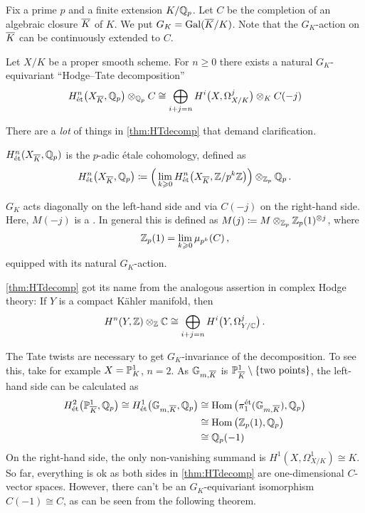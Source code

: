 \documentclass[a4paper, 10pt, oneside, DIV=9, chapterprefix=true, numbers=enddot]{scrbook}
\begin{document}
Fix a prime $p$ and a finite extension $K/\mathbb{Q}_p$. Let $C$ be the completion of an algebraic closure $\ov{K}$ of $K$. We put $G_K=\Gal(\ov{K}/K)$. Note that the $G_K$-action on $\ov{K}$ can be continuously extended to $C$.
\begin{thm}\label{thm:HTdecomp}
	Let $X/K$ be a proper smooth scheme. For $n\geq 0$ there exists a natural $G_K$-equivariant \enquote{Hodge--Tate decomposition}
	\begin{equation*}
		H_\et^n\big(X_{\ov{K}},\IQ_p\big)\otimes_{\IQ_p}C\cong \bigoplus_{i+j=n}H^i\big(X,\Omega_{X/K}^j\big)\otimes_KC(-j)
	\end{equation*}
\end{thm}
\begin{rem}\label{rem:HTdecomp}
	There are a \emph{lot} of things in \cref{thm:HTdecomp} that demand clarification.
	\begin{numerate}
		\item $H_\et^n(X_{\ov{K}},\IQ_p)$ is the $p$-adic étale cohomology, defined as
		\begin{equation*}
			H_\et^n\big(X_{\ov{K}},\IQ_p\big)\coloneqq \Big(\lim_{k\geq 0} H_{\et}^n\big(X_{\ov{K}},\IZ/p^k\IZ\big)\Big)\otimes_{\IZ_p}\IQ_p\,.
		\end{equation*}
		\item $G_K$ acts diagonally on the left-hand side and via $C(-j)$ on the right-hand side. Here, $M(-j)$ is a . In general this is defined as $M(j)\coloneqq M\otimes_{\mathbb{Z}_p}\mathbb{Z}_p(1)^{\otimes j}$, where
		\begin{equation*}
			\mathbb{Z}_p(1)=\lim_{k\geqslant 0}\mu_{p^k}(C)\,,
		\end{equation*}
		equipped with its natural $G_K$-action.
		\item \cref{thm:HTdecomp} got its name from the analogous assertion in complex Hodge theory: If $Y$ is a compact Kähler manifold, then
		\begin{equation*}
			H^n(Y,\mathbb{Z})\otimes_{\mathbb{Z}}\mathbb{C}\cong\bigoplus_{i+j=n}H^i\big(Y,\Omega_{Y/\mathbb{C}}^j\big)\,.
		\end{equation*}
		\item The Tate twists are necessary to get $G_K$-invariance of the decomposition. To see this, take for example $X=\mathbb{P}_K^1$, $n=2$. As $\IG_{m,\ov{K}}$ is $\IP_{\ov{K}}^1\setminus\{\text{two points}\}$, the left-hand side can be calculated as
		\begin{align*}
			H_\et^2\big(\IP_{\ov{K}}^1,\IQ_p\big)\cong H_\et^1\big(\IG_{m,\ov{K}},\IQ_p\big)&\cong \Hom\big(\pi_1^\et(\IG_{m,\ov{K}}),\IQ_p\big)\\
			&\cong \Hom\big(\IZ_p(1),\IQ_p\big)\\
			&\cong \IQ_p(-1)
		\end{align*}
		On the right-hand side, the only non-vanishing summand is $H^1(X,\Omega_{X/K}^1)\cong K$. So far, everything is ok as both sides in \cref{thm:HTdecomp} are one-dimensional $C$-vector spaces. However, there can't be an $G_K$-equivariant isomorphism $C(-1)\cong C$, as can be seen from the following theorem. 
	\end{numerate}
\end{rem}
\end{document}
